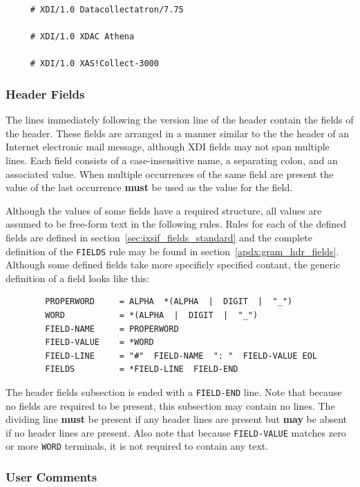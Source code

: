 \documentclass{article}
\newcommand{\xdi}{\textsf{XDI}}
\begin{document}
\begin{verbatim}
     # XDI/1.0 Datacollectatron/7.75

     # XDI/1.0 XDAC Athena

     # XDI/1.0 XAS!Collect-3000
\end{verbatim}


\subsubsection{Header Fields}
\label{sec:def_hdr_fields}

The lines immediately following the version line of the header contain
the fields of the header.  These fields are arranged in a manner
similar to the the header of an Internet electronic mail message,
although {\xdi} fields may not span multiple lines.  Each field
consists of a case-insensitive name, a separating colon, and an
associated value.  When multiple occurrences of the same field are
present the value of the last occurrence \textbf{must} be used as the
value for the field.

Although the values of some fields have a required structure, all
values are assumed to be free-form text in the following rules.  Rules
for each of the defined fields are defined in
section~\ref{sec:ixsif_fields_standard} and the complete definition of
the \texttt{FIELDS} rule may be found in
section~\ref{apdx:gram_hdr_fields}.  Although some defined fields take
more specificly specified contant, the generic definition of a field
looks like this:

\begin{verbatim}
        PROPERWORD     = ALPHA  *(ALPHA  |  DIGIT  |  "_")
        WORD           = *(ALPHA  |  DIGIT  |  "_")
        FIELD-NAME     = PROPERWORD
        FIELD-VALUE    = *WORD
        FIELD-LINE     = "#"  FIELD-NAME  ": "  FIELD-VALUE EOL
        FIELDS         = *FIELD-LINE  FIELD-END
\end{verbatim}

The header fields subsection is ended with a \texttt{FIELD-END} line.
Note that because no fields are required to be present, this
subsection may contain no lines. The dividing line \textbf{must} be
present if any header lines are present but \textbf{may} be absent if
no header lines are present.  Also note that because
\texttt{FIELD-VALUE} matches zero or more \texttt{WORD} terminals, it
is not required to contain any text.

\subsubsection{User Comments}
\label{sec:def_hdr_comments}
\end{document}
